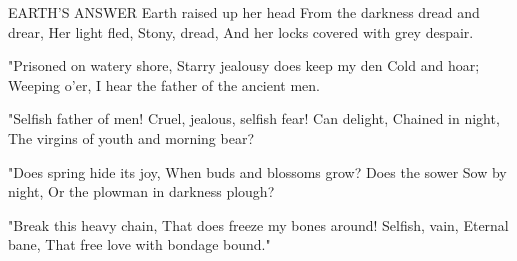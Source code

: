 EARTH'S ANSWER
   Earth raised up her head
   From the darkness dread and drear,
   Her light fled,
   Stony, dread,
   And her locks covered with grey despair.
   
   "Prisoned on watery shore,
   Starry jealousy does keep my den
   Cold and hoar;
   Weeping o'er,
   I hear the father of the ancient men.
   
   "Selfish father of men!
   Cruel, jealous, selfish fear!
   Can delight,
   Chained in night,
   The virgins of youth and morning bear?
   
   "Does spring hide its joy,
   When buds and blossoms grow?
   Does the sower
   Sow by night,
   Or the plowman in darkness plough?
   
   "Break this heavy chain,
   That does freeze my bones around!
   Selfish, vain,
   Eternal bane,
   That free love with bondage bound."